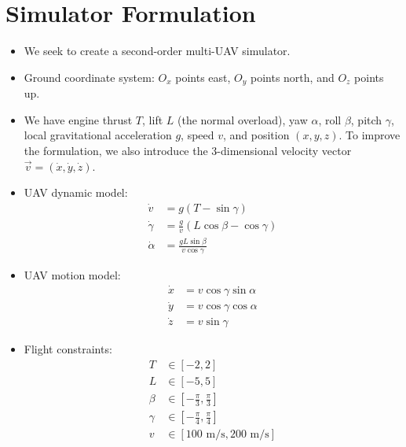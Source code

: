 \documentclass{article}
\begin{document}
\section*{Simulator Formulation}
\begin{itemize}
    \item We seek to create a second-order multi-UAV simulator.
    \item Ground coordinate system: $O_{x}$ points east, $O_{y}$ points north, and $O_{z}$ points up.
    \item We have engine thrust $T$, lift $L$ (the normal overload), yaw $\alpha$, roll $\beta$, pitch $\gamma$, local
        gravitational acceleration $g$, speed $v$, and position $(x, y, z)$. To improve the formulation, we also introduce the
        3-dimensional velocity vector $\vec{v} = (\dot{x}, \dot{y}, \dot{z})$.
    \item UAV dynamic model:
    \begin{align*}
        \dot{v} &= g(T - \sin \gamma) \\
        \dot{\gamma} &= \frac{g}{v} (L \cos \beta - \cos \gamma) \\
        \dot{\alpha} &= \frac{g L \sin \beta}{v \cos \gamma}
    \end{align*}
    \item UAV motion model:
    \begin{align*}
        \dot{x} &= v \cos \gamma \sin \alpha \\
        \dot{y} &= v \cos \gamma \cos \alpha \\
        \dot{z} &= v \sin \gamma
    \end{align*}
    \item Flight constraints:
    \begin{align*}
        T &\in [-2, 2] \\
        L &\in [-5, 5] \\
        \beta &\in [-\frac{\pi}{3}, \frac{\pi}{3}] \\
        \gamma &\in [-\frac{\pi}{4}, \frac{\pi}{4}] \\
        v &\in [100 \text{ m/s}, 200 \text{ m/s}]
    \end{align*}
\end{itemize}
\end{document}
